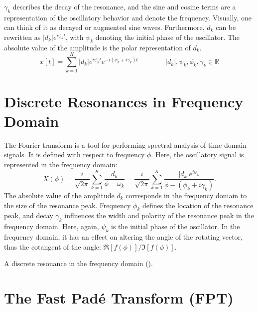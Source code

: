 $\gamma_k$ describes the decay of the resonance, and the sine and cosine terms are a representation of the oscillatory behavior and denote the frequency.  Visually, one can think of it as decayed or augmented sine waves. 
Furthermore, $d_k$ can be rewritten as $|d_k|e^{i\psi_kt}$, with $\psi_k$ denoting the initial phase of the oscillator. The absolute value of the amplitude is the polar representation of $d_k$.
\begin{equation}
    x[t] = \sum^K_{k=1} |d_k|e^{i\psi_kt} e^{-i(\phi_k + i \gamma _k)t}  
    \; \; \; \; \; \; \; \; \; \; \; \; \; \;
    |d_k|, \psi_k, \phi_k, \gamma_k \in \mathbb{R}
\end{equation}



\section{Discrete Resonances in Frequency Domain}


The Fourier transform is a tool for performing spectral analysis of time-domain signals. It is defined with respect to frequency $\phi$. Here, the oscillatory signal is represented in the frequency domain:
\begin{equation}
    X(\phi) = \frac{i}{\sqrt{2 \pi}} \sum^K_{k=1} \frac{d_k}{\phi - \omega_k} = \frac{i}{\sqrt{2 \pi}} \sum^K_{k=1} \frac{|d_k| e^{i\psi_k}}{\phi - (\phi_k + i \gamma_k)}.
\end{equation}
The absolute value of the amplitude $d_k$ corresponds in the frequency domain to the size of the resonance peak. Frequency $\phi_k$ defines the location of the resonance peak, and decay $\gamma_k$ influences the width and polarity of the resonance peak in the frequency domain. Here, again, $\psi_k$ is the initial phase of the oscillator. In the frequency domain, it has an effect on altering the angle of the rotating vector, thus the cotangent of the angle: $\Re[f(\phi)]/\Im[f(\phi)]$. 

\begin{marginfigure}
\centering

\caption{A discrete resonance in the frequency domain (\cite{homer_modelling_2023}).}
\label{resonanceFreqSpec} 
\end{marginfigure}

\section{The Fast Padé Transform (FPT)}

